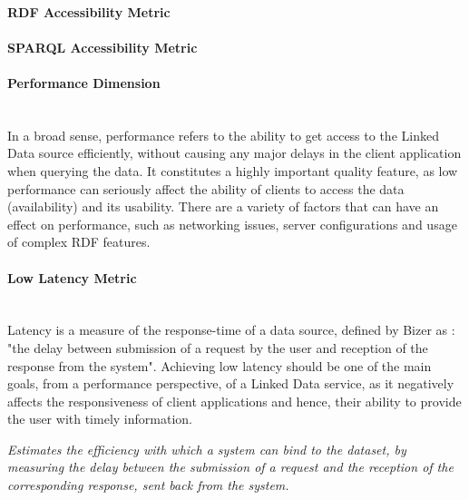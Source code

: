 \paragraph{RDF Accessibility Metric} 
\paragraph{SPARQL Accessibility Metric} 

\paragraph{Performance Dimension}~\\ %
In a broad sense, performance refers to the ability to get access to the Linked Data source efficiently, without causing any major delays in the client application when querying the data. It constitutes a highly important quality feature, as low performance can seriously affect the ability of clients to access the data (availability) and its usability. There are a variety of factors that can have an effect on performance, such as networking issues, server configurations and usage of complex RDF features.

\paragraph{Low Latency Metric} ~\\ %
Latency is a measure of the response-time of a data source, defined by Bizer as \cite{Bizer2008:PhDThesis:biblatex}: "the delay between submission of a request by the user and reception of the response from the system". Achieving low latency should be one of the main goals, from a performance perspective, of a Linked Data service, as it negatively affects the responsiveness of client applications and hence, their ability to provide the user with timely information.
\begin{mdframed}[style=metricdefinition]
\emph{Estimates the efficiency with which a system can bind to the dataset, by measuring the delay between the submission of a request  and the reception of the corresponding response, sent back from the system.}
\end{mdframed}

